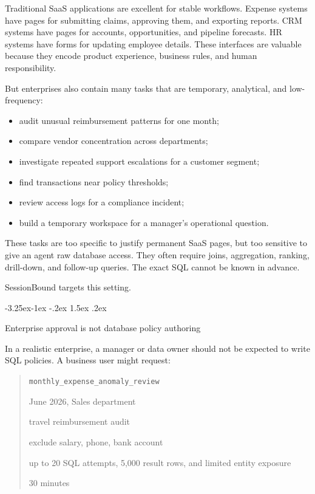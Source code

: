 \documentclass[10pt,twocolumn]{article}
\makeatletter
\providecommand{\tightlist}{%
  \setlength{\itemsep}{0pt}\setlength{\parskip}{0pt}}
\renewcommand\subsection{\@startsection{subsection}{2}{\z@}%
  {-3.25ex\@plus -1ex \@minus -.2ex}%
  {1.5ex \@plus .2ex}%
  {\normalfont\large\bfseries\raggedright}}
\makeatother
\begin{document}
Traditional SaaS applications are excellent for stable workflows.
Expense systems have pages for submitting claims, approving them, and
exporting reports. CRM systems have pages for accounts, opportunities,
and pipeline forecasts. HR systems have forms for updating employee
details. These interfaces are valuable because they encode product
experience, business rules, and human responsibility.

But enterprises also contain many tasks that are temporary, analytical,
and low-frequency:

\begin{itemize}
\tightlist
\item
  audit unusual reimbursement patterns for one month;
\item
  compare vendor concentration across departments;
\item
  investigate repeated support escalations for a customer segment;
\item
  find transactions near policy thresholds;
\item
  review access logs for a compliance incident;
\item
  build a temporary workspace for a manager's operational question.
\end{itemize}

These tasks are too specific to justify permanent SaaS pages, but too
sensitive to give an agent raw database access. They often require
joins, aggregation, ranking, drill-down, and follow-up queries. The
exact SQL cannot be known in advance.

SessionBound targets this setting.

\hypertarget{enterprise-approval-is-not-database-policy-authoring}{%
\subsection{Enterprise approval is not database policy
authoring}\label{enterprise-approval-is-not-database-policy-authoring}}

In a realistic enterprise, a manager or data owner should not be
expected to write SQL policies. A business user might request:

\begin{quote}
\begin{description}
\tightlist
\item[Task type:]
{\scriptsize\texttt{monthly\_expense\_anomaly\_review}}
\item[Scope:]
June 2026, Sales department
\item[Purpose:]
travel reimbursement audit
\item[Sensitivity:]
exclude salary, phone, bank account
\item[Budget:]
up to 20 SQL attempts, 5,000 result rows, and limited entity exposure
\item[TTL:]
30 minutes
\end{description}
\end{quote}
\end{document}
